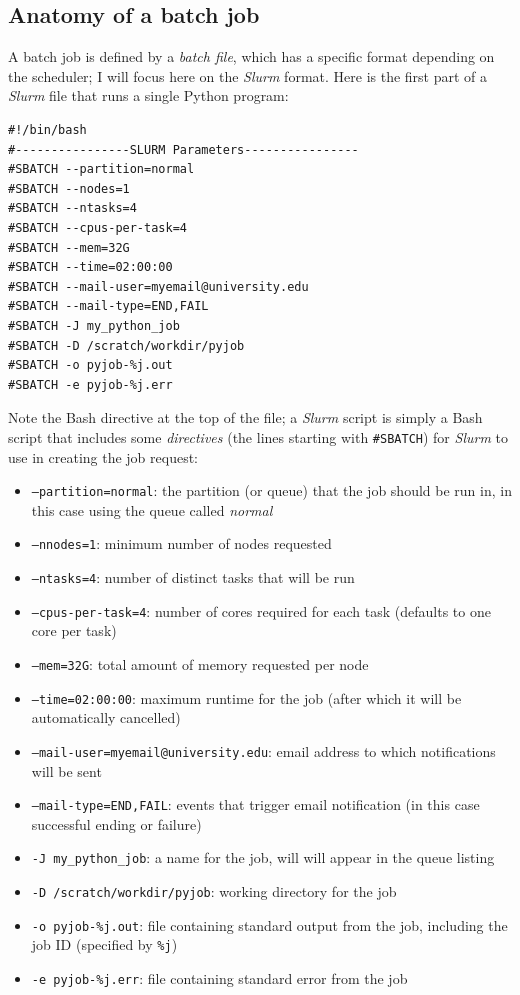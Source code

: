 \subsection{Anatomy of a batch job}

A batch job is defined by a \textit{batch file}, which has a specific format depending on the scheduler; I will focus here on the \textit{Slurm} format.  Here is the first part of a \textit{Slurm} file that runs a single Python program:

\begin{lstlisting}[style=shell]
#!/bin/bash
#----------------SLURM Parameters----------------
#SBATCH --partition=normal
#SBATCH --nodes=1
#SBATCH --ntasks=4
#SBATCH --cpus-per-task=4
#SBATCH --mem=32G
#SBATCH --time=02:00:00
#SBATCH --mail-user=myemail@university.edu
#SBATCH --mail-type=END,FAIL
#SBATCH -J my_python_job
#SBATCH -D /scratch/workdir/pyjob
#SBATCH -o pyjob-%j.out
#SBATCH -e pyjob-%j.err
\end{lstlisting}

Note the Bash directive at the top of the file; a \textit{Slurm} script is simply a Bash script that includes some \textit{directives} (the lines starting with \texttt{\#SBATCH}) for \textit{Slurm} to use in creating the job request:

\begin{itemize}
\item \texttt{--partition=normal}: the partition (or queue) that the job should be run in, in this case using the queue called \textit{normal}
\item \texttt{--nnodes=1}: minimum number of nodes requested
\item \texttt{--ntasks=4}: number of distinct tasks that will be run
\item \texttt{--cpus-per-task=4}: number of cores required for each task (defaults to one core per task)
\item \texttt{--mem=32G}: total amount of memory requested per node
\item \texttt{--time=02:00:00}: maximum runtime for the job (after which it will be automatically cancelled)
\item \texttt{--mail-user=myemail@university.edu}: email address to which notifications will be sent
\item \texttt{--mail-type=END,FAIL}: events that trigger email notification (in this case successful ending or failure)
\item \texttt{-J my\_python\_job}: a name for the job, will will appear in the queue listing
\item \texttt{-D /scratch/workdir/pyjob}: working directory for the job
\item \texttt{-o pyjob-\%j.out}: file containing standard output from the job, including the job ID (specified by \texttt{\%j})
\item \texttt{-e pyjob-\%j.err}: file containing standard error from the job
\end{itemize}

